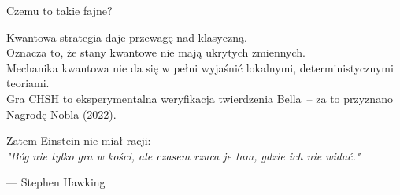 
\begin{frame}{Czemu to takie fajne?}
 
Kwantowa strategia daje przewagę nad klasyczną.\\[1mm]
Oznacza to, że stany kwantowe nie mają ukrytych zmiennych.\\
Mechanika kwantowa nie da się w pełni wyjaśnić lokalnymi, deterministycznymi teoriami.\\[1mm]
\pause
Gra CHSH to eksperymentalna weryfikacja twierdzenia Bella~-- za to przyznano Nagrodę Nobla (2022).\\
 
\pause
 
Zatem Einstein nie miał racji:
\vspace{1em}
\\
\textit{"Bóg nie tylko gra w kości, ale czasem rzuca je tam,
      gdzie ich nie widać."}
 
\hfill\small--- Stephen Hawking
 
\end{frame}